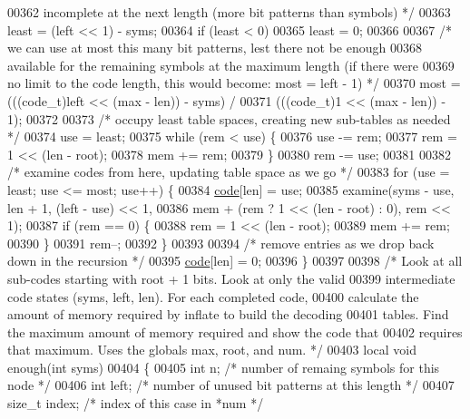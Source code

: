 \begin{DoxyCode}
{{00362 \textcolor{comment}{       incomplete at the next length (more bit patterns than symbols) */}
00363     least = (left << 1) - syms;
00364     \textcolor{keywordflow}{if} (least < 0)
00365         least = 0;
00366 
00367     \textcolor{comment}{/* we can use at most this many bit patterns, lest there not be enough}
00368 \textcolor{comment}{       available for the remaining symbols at the maximum length (if there were}
00369 \textcolor{comment}{       no limit to the code length, this would become: most = left - 1) */}
00370     most = (((code\_t)left << (max - len)) - syms) /
00371             (((code\_t)1 << (max - len)) - 1);
00372 
00373     \textcolor{comment}{/* occupy least table spaces, creating new sub-tables as needed */}
00374     use = least;
00375     \textcolor{keywordflow}{while} (rem < use) \{
00376         use -= rem;
00377         rem = 1 << (len - root);
00378         mem += rem;
00379     \}
00380     rem -= use;
00381 
00382     \textcolor{comment}{/* examine codes from here, updating table space as we go */}
00383     \textcolor{keywordflow}{for} (use = least; use <= most; use++) \{
00384         \hyperlink{structcode}{code}[len] = use;
00385         examine(syms - use, len + 1, (left - use) << 1,
00386                 mem + (rem ? 1 << (len - root) : 0), rem << 1);
00387         \textcolor{keywordflow}{if} (rem == 0) \{
00388             rem = 1 << (len - root);
00389             mem += rem;
00390         \}
00391         rem--;
00392     \}
00393 
00394     \textcolor{comment}{/* remove entries as we drop back down in the recursion */}
00395     \hyperlink{structcode}{code}[len] = 0;
00396 \}
00397 
00398 \textcolor{comment}{/* Look at all sub-codes starting with root + 1 bits.  Look at only the valid}
00399 \textcolor{comment}{   intermediate code states (syms, left, len).  For each completed code,}
00400 \textcolor{comment}{   calculate the amount of memory required by inflate to build the decoding}
00401 \textcolor{comment}{   tables. Find the maximum amount of memory required and show the code that}
00402 \textcolor{comment}{   requires that maximum.  Uses the globals max, root, and num. */}
00403 local \textcolor{keywordtype}{void} enough(\textcolor{keywordtype}{int} syms)
00404 \{
00405     \textcolor{keywordtype}{int} n;              \textcolor{comment}{/* number of remaing symbols for this node */}
00406     \textcolor{keywordtype}{int} left;           \textcolor{comment}{/* number of unused bit patterns at this length */}
00407     \textcolor{keywordtype}{size\_t} index;       \textcolor{comment}{/* index of this case in *num */}
}}
\end{DoxyCode}
